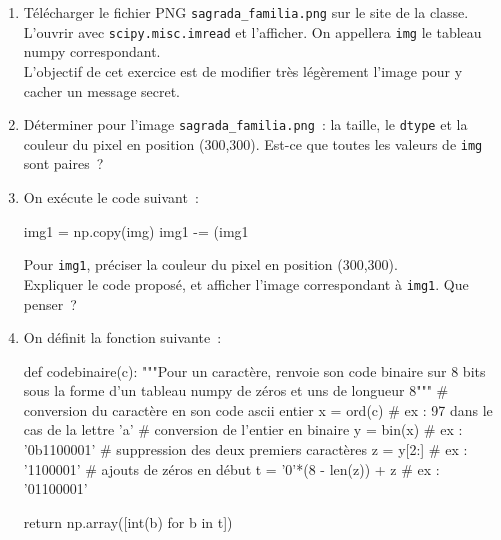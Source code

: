 \begin{enumerate}
\item 
  Télécharger le fichier PNG \texttt{sagrada\_familia.png}
  sur le site de la classe. \\
  L'ouvrir avec \texttt{scipy.misc.imread} et l'afficher. On
  appellera \texttt{img} le tableau numpy correspondant.\\
  L'objectif de cet exercice est de modifier très légèrement l'image
  pour y cacher un message secret.


\item 
  Déterminer pour l'image \texttt{sagrada\_familia.png}~: la taille, le
  \texttt{dtype} et la couleur du  pixel en position (300,300). 
  Est-ce que toutes les valeurs de \texttt{img} sont paires~?

\item 
  On exécute le code suivant~: 

  \begin{python}
img1 = np.copy(img)
img1 -= (img1 %
  \end{python}
  
  Pour \texttt{img1}, préciser la couleur du pixel en position (300,300).\\
  Expliquer le code proposé, et afficher l'image correspondant à
  \texttt{img1}. Que penser~?

\item 
  On définit la fonction suivante~: 

  \begin{python}
def codebinaire(c):
    """Pour un caractère, renvoie son code binaire sur 8 bits
    sous la forme d'un tableau numpy de zéros et uns de longueur 8"""
    # conversion du caractère en son code ascii entier
    x = ord(c)                   # ex : 97 dans le cas de la lettre 'a'
    # conversion de l'entier en binaire
    y = bin(x)                   # ex : '0b1100001'
    # suppression des deux premiers caractères
    z = y[2:]                    # ex : '1100001'
    # ajouts de zéros en début
    t = '0'*(8 - len(z)) + z     # ex : '01100001'
    
    return np.array([int(b) for b in t])    
  \end{python}


\end{enumerate}
